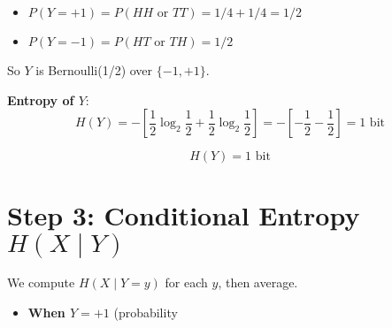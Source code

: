 \documentclass{article}
\begin{document}
\begin{itemize}
\item \(P(Y = +1) = P(HH \text{ or } TT) = 1/4 + 1/4 = 1/2\)
    \item \(P(Y = -1) = P(HT \text{ or } TH) = 1/2\)
\end{itemize}

So \(Y\) is Bernoulli(1/2) over \(\{-1, +1\}\).

\textbf{Entropy of \(Y\)}:
\[
H(Y) = -\left[ \frac{1}{2} \log_2 \frac{1}{2} + \frac{1}{2} \log_2 \frac{1}{2} \right] = -\left[ -\frac{1}{2} - \frac{1}{2} \right] = 1 \text{ bit}
\]

\[
\boxed{H(Y) = 1 \text{ bit}}
\]

\section*{Step 3: Conditional Entropy \(H(X \mid Y)\)}

We compute \(H(X \mid Y = y)\) for each \(y\), then average.

\begin{itemize}
    \item \textbf{When \(Y = +1\)} (probability
\end{itemize}
\end{document}
